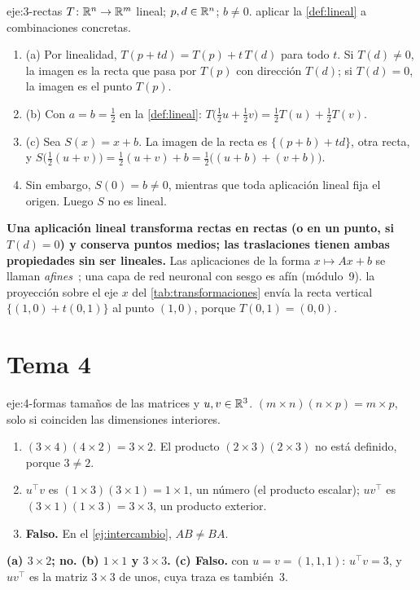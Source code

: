 \begin{solucion}{eje:3-rectas}
\datos $T\colon\mathbb{R}^{n}\to\mathbb{R}^{m}$ lineal; $p,d\in\mathbb{R}^{n}$; $b\neq 0$.
\planteamiento aplicar la \cref{def:lineal} a combinaciones concretas.
\pasos
\begin{enumerate}[label=\arabic*.]
  \item (a) Por linealidad, $T(p+td)=T(p)+t\,T(d)$ para todo $t$. Si $T(d)\neq 0$, la imagen es la recta que pasa por $T(p)$ con dirección $T(d)$; si $T(d)=0$, la imagen es el punto $T(p)$.
  \item (b) Con $a=b=\tfrac12$ en la \cref{def:lineal}: $T\bigl(\tfrac12u+\tfrac12v\bigr)=\tfrac12T(u)+\tfrac12T(v)$.
  \item (c) Sea $S(x)=x+b$. La imagen de la recta es $\{(p+b)+td\}$, otra recta, y $S\bigl(\tfrac12(u+v)\bigr)=\tfrac12(u+v)+b=\tfrac12\bigl((u+b)+(v+b)\bigr)$.
  \item Sin embargo, $S(0)=b\neq 0$, mientras que toda aplicación lineal fija el origen. Luego $S$ no es lineal.
\end{enumerate}
\resultado \textbf{Una aplicación lineal transforma rectas en rectas (o en un punto, si $T(d)=0$) y conserva puntos medios; las traslaciones tienen ambas propiedades sin ser lineales.} Las aplicaciones de la forma $x\mapsto Ax+b$ se llaman \emph{afines}~\cite[§8.1]{vmls}; una capa de red neuronal con sesgo es afín (módulo~9).
\comprobacion la proyección sobre el eje $x$ del \cref{tab:transformaciones} envía la recta vertical $\{(1,0)+t(0,1)\}$ al punto $(1,0)$, porque $T(0,1)=(0,0)$.
\end{solucion}

\section{Tema 4}

\begin{solucion}{eje:4-formas}
\datos tamaños de las matrices y $u,v\in\mathbb{R}^{3}$.
\planteamiento $(m\times n)(n\times p)=m\times p$, solo si coinciden las dimensiones interiores.
\pasos
\begin{enumerate}[label=(\alph*)]
  \item $(3\times 4)(4\times 2)=3\times 2$. El producto $(2\times 3)(2\times 3)$ no está definido, porque $3\neq 2$.
  \item $u^{\top}v$ es $(1\times 3)(3\times 1)=1\times 1$, un número (el producto escalar); $uv^{\top}$ es $(3\times 1)(1\times 3)=3\times 3$, un producto exterior.
  \item \textbf{Falso.} En el \cref{ej:intercambio}, $AB\neq BA$.
\end{enumerate}
\resultado \textbf{(a) $3\times 2$; no. (b) $1\times 1$ y $3\times 3$. (c) Falso.}
\comprobacion con $u=v=(1,1,1)$: $u^{\top}v=3$, y $uv^{\top}$ es la matriz $3\times 3$ de unos, cuya traza es también~3.
\end{solucion}

